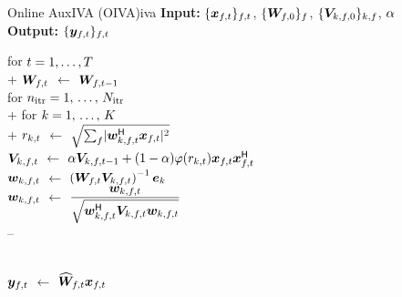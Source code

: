 \documentclass[sip,biber]{now-journal}
\begin{document}
\begin{algorithm}{Online AuxIVA (OIVA)}{iva}
  \textbf{Input:} $\{\Obs _{\ft}\} _{\ft}$, $ \{\bm{W} _{f,0}\}_{f}$, $ \{\bm{V} _{k,f,0}\}_{k,f}$, $ \alpha$\\
  \textbf{Output:} $\{\Est _{\ft}\} _{\ft}$
  \begin{pseudo}
    for $t = 1, \dots, T$ \\+
      {$\Demix _{\ft}$} $\gets$ $\Demix _{\ft[-1]}$ \ct{$\forall \freq$} \\

      for $n _{\mathrm{itr}} = 1,\, \dots,\, N _{\mathrm{itr}}$ \\+
        for $k = 1,\, \dots,\, K$ \\+
          {$r _{k,t}$} $\gets$ $\sqrt{\sum _{\freq} \abs{\demix _{\src,\ft} ^{\hermite} \Obs _{\ft}} ^2}$ \ct{\eqref{eq:var}} \\
          {$\cov _{\src,\ft}    $} $\gets$ $\forget \cov _{\src,\ft[-1]} + (1 - \forget) \weight(\var _{\src,\tframe}) \Obs _{\ft} \Obs _{\ft} ^{\hermite}$ \ct{\eqref{eq:cov}, $\forall \freq$} \\
          {$\demix _{\src,\ft}$} $\gets$ $\left(\Demix _{\ft} \cov _{\src,\ft}\right) ^{-1} \eye _{\src}$ \ct{\eqref{eq:ip:proj}, $\forall \freq$} \\
          {$\demix _{\src,\ft}$} $\gets$ $\dfrac{\demix _{\src,\ft}}{\sqrt{\demix _{\src,\ft} ^{\hermite} \cov _{\src,\ft} \demix _{\src,\ft}}}$ \ct{\eqref{eq:ip:norm}, $\forall \freq$} \\--

       \ct{\eqref{eq:pb:w}, $\forall \freq$}\\
      {$\Est _{\ft}$} $\gets$ $\proj{\Demix }_{\ft} \Obs _{\ft}$ \ct{\eqref{eq:pb:y}, $\forall \freq$}
  \end{pseudo}
\end{algorithm}
\end{document}
